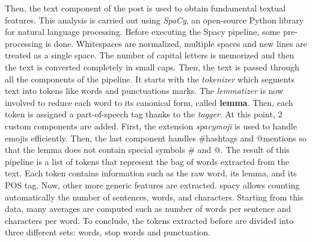 Then, the text component of the post is used to obtain fundamental textual features. This analysis is carried out using \textit{SpaCy}, an open-source Python library for natural language processing.
Before executing the Spacy pipeline, some pre-processing is done. Whitespaces are normalized, multiple spaces and new lines are treated as a single space. The number of capital letters is memorized and then the text is converted completely in small caps.
Then, the text is passed through all the components of the pipeline. It starts with the \textit{tokenizer} which segments text into tokens like words and punctuations marks. The \textit{lemmatizer} is now involved to reduce each word to its canonical form, called \textbf{lemma}. Then, each token is assigned a part-of-speech tag thanks to the \textit{tagger}.
At this point, 2 custom components are added. First, the extension \textit{spacymoji} is used to handle emojis efficiently. Then, the last component handles #hashtags and @mentions so that the lemma does not contain special symbols # and @.
The result of this pipeline is a list of tokens that represent the bag of words extracted from the text. Each token contains information such as the raw word, its lemma, and its POS tag.
Now, other more generic features are extracted. spacy allows counting automatically the number of sentences, words, and characters. Starting from this data, many averages are computed such as number of words per sentence and characters per word.
To conclude, the tokens extracted before are divided into three different sets: words, stop words and punctuation.

